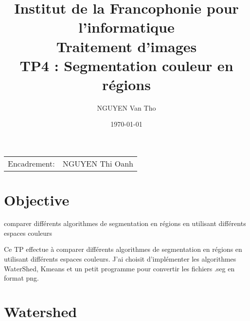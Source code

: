 \documentclass[article=a4, fontsize=11pt]{scrartcl}	%
\title{ \Large {Institut de la Francophonie pour l'informatique \\ 
\Huge Traitement d'images}\\
\Large TP4 : Segmentation couleur en régions} %
\author{\textsc{NGUYEN} Van Tho} %
\date{\today} %
\begin{document}
\maketitle %

\begin{center}
\begin{tabular}{l r}
Encadrement: & NGUYEN Thi Oanh %
\end{tabular}
\end{center}



\section{Objective}
comparer différents algorithmes de segmentation en
régions en utilisant différents espaces couleurs

Ce TP effectue à comparer différents algorithmes de segmentation en régions en utilisant différents espaces couleurs. J'ai choisit d'implémenter les algorithmes WaterShed, Kmeans et un petit programme pour convertir les fichiers .seg en format png.

\section{Watershed}
\end{document}
